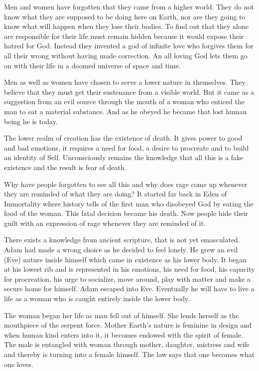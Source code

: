 \documentclass[landscape,twocolumn,letterpaper]{article}
\begin{document}
Men and women have forgotten that they came from a higher world. They
do not know what they are supposed to be doing here on Earth, nor are
they going to know what will happen when they lose their bodies. To
find out that they alone are responsible for their life must remain
hidden because it would expose their hatred for God. Instead they
invented a god of infinite love who forgives them for all their wrong
without having made correction. An all loving God lets them go on with
their life in a doomed universe of space and time.

Men as well as women have chosen to serve a lower nature in
themselves. They believe that they must get their sustenance from a
visible world. But it came as a suggestion from an evil source through
the mouth of a woman who enticed the man to eat a material
substance. And as he obeyed he became that lost human being he is
today.

The lower realm of creation has the existence of death. It gives power
to good and bad emotions, it requires a need for food, a desire to
procreate and to build an identity of Self. Unconsciously remains the
knowledge that all this is a fake existence and the result is fear of
death.

Why have people forgotten to see all this and why does rage come up
whenever they are reminded of what they are doing? It started far back
in Eden of Immortality where history tells of the first man who
disobeyed God by eating the food of the woman. This fatal decision
became his death. Now people hide their guilt with an expression of
rage whenever they are reminded of it.

There exists a knowledge from ancient scripture, that is not yet
emasculated.  Adam had made a wrong choice as he decided to feel
lonely. He grew an evil (Eve) nature inside himself which came in
existence as his lower body. It began at his lowest rib and is
represented in his emotions, his need for food, his capacity for
procreation, his urge to socialize, move around, play with matter and
make a secure home for himself. Adam escaped into Eve. Eventually he
will have to live a life as a woman who is caught entirely inside the
lower body.

The woman began her life as man fell out of himself. She lends herself
as the mouthpiece of the serpent force. Mother Earth's nature is feminine
in design and when human kind enters into it, it becomes endowed with
the spirit of female.  The male is entangled with woman through
mother, daughter, mistress and wife and thereby is turning into a
female himself. The law says that one becomes what one loves.
\end{document}
